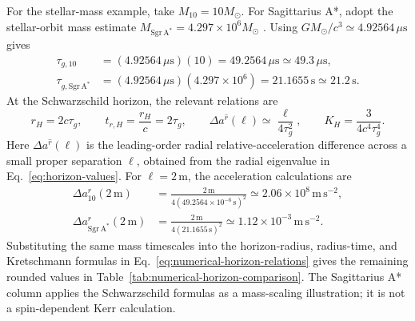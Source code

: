 \documentclass[12pt]{article}
\begin{document}
For the stellar-mass example, take $M_{10}=10M_\odot$. For Sagittarius A*, adopt the stellar-orbit mass estimate $M_{\mathrm{Sgr\,A^*}}=4.297\times10^6M_\odot$ \cite{GravitySgrA}. Using $GM_\odot/c^3\simeq4.92564\,\mu\mathrm{s}$ gives
\begin{align}
  \tau_{g,10}
    &=(4.92564\,\mu\mathrm{s})(10)
      =49.2564\,\mu\mathrm{s}\simeq49.3\,\mu\mathrm{s},\\
  \tau_{g,\mathrm{Sgr\,A^*}}
    &=(4.92564\,\mu\mathrm{s})(4.297\times10^6)
      =21.1655\,\mathrm{s}\simeq21.2\,\mathrm{s}.
  \label{eq:numerical-mass-times}
\end{align}
At the Schwarzschild horizon, the relevant relations are
\begin{equation}
  r_H=2c\tau_g,
  \qquad
  t_{r,H}=\frac{r_H}{c}=2\tau_g,
  \qquad
  \Delta a^{\hat r}(\ell)\simeq\frac{\ell}{4\tau_g^2},
  \qquad
  K_H=\frac{3}{4c^4\tau_g^4}.
  \label{eq:numerical-horizon-relations}
\end{equation}
Here $\Delta a^{\hat r}(\ell)$ is the leading-order radial relative-acceleration difference across a small proper separation $\ell$, obtained from the radial eigenvalue in Eq.~\eqref{eq:horizon-values}. For $\ell=2\,\mathrm{m}$, the acceleration calculations are
\begin{align}
  \Delta a^{\hat r}_{10}(2\,\mathrm{m})
    &=\frac{2\,\mathrm{m}}{4(49.2564\times10^{-6}\,\mathrm{s})^2}
      \simeq2.06\times10^8\,\mathrm{m\,s^{-2}},\\
  \Delta a^{\hat r}_{\mathrm{Sgr\,A^*}}(2\,\mathrm{m})
    &=\frac{2\,\mathrm{m}}{4(21.1655\,\mathrm{s})^2}
      \simeq1.12\times10^{-3}\,\mathrm{m\,s^{-2}}.
  \label{eq:numerical-horizon-values}
\end{align}
Substituting the same mass timescales into the horizon-radius, radius-time, and Kretschmann formulas in Eq.~\eqref{eq:numerical-horizon-relations} gives the remaining rounded values in Table~\ref{tab:numerical-horizon-comparison}. The Sagittarius A* column applies the Schwarzschild formulas as a mass-scaling illustration; it is not a spin-dependent Kerr calculation.
\end{document}
